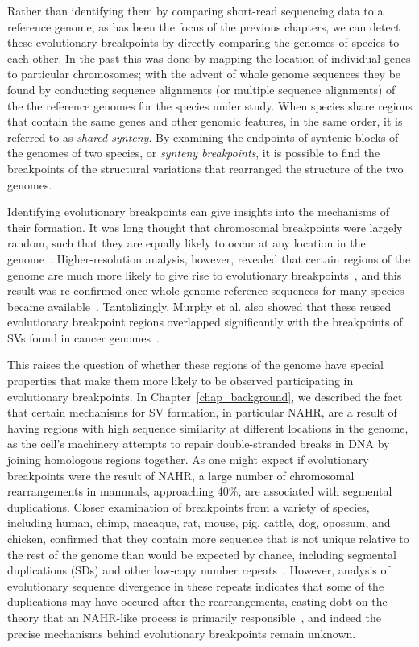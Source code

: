 Rather than identifying them by comparing short-read sequencing data to a reference genome, as has been the focus of the previous chapters, we can detect these evolutionary breakpoints by directly comparing the genomes of species to each other. In the past this was done by mapping the location of individual genes to particular chromosomes; with the advent of whole genome sequences they be found by conducting sequence alignments (or multiple sequence alignments) of the the reference genomes for the species under study. When species share regions that contain the same genes and other genomic features, in the same order, it is referred to as \emph{shared synteny}. By examining the endpoints of syntenic blocks of the genomes of two species, or \emph{synteny breakpoints}, it is possible to find the breakpoints of the structural variations that rearranged the structure of the two genomes.

Identifying evolutionary breakpoints can give insights into the mechanisms of their formation. It was long thought that chromosomal breakpoints were largely random, such that they are equally likely to occur at any location in the genome~\cite{Ono:1973tr,Nadeau:1984tm}. Higher-resolution analysis, however, revealed that certain regions of the genome are much more likely to give rise to evolutionary breakpoints~\cite{Pevzner:2003ba}, and this result was re-confirmed once whole-genome reference sequences for many species became available~\cite{Murphy:2005hv}. Tantalizingly, Murphy et al. also showed that these reused evolutionary breakpoint regions overlapped significantly with the breakpoints of SVs found in cancer genomes~\cite{Murphy:2005hv}.

This raises the question of whether these regions of the genome have special properties that make them more likely to be observed participating in evolutionary breakpoints. In Chapter~\ref{chap_background}, we described the fact that certain mechanisms for SV formation, in particular NAHR, are a result of having regions with high sequence similarity at different locations in the genome, as the cell's machinery attempts to repair double-stranded breaks in DNA by joining homologous regions together. As one might expect if evolutionary breakpoints were the result of NAHR, a large number of chromosomal rearrangements in mammals, approaching 40\%, are associated with segmental duplications\cite{Bailey:2004fb,Bailey:2006fn}. Closer examination of breakpoints from a variety of species, including human, chimp, macaque, rat, mouse, pig, cattle, dog, opossum, and chicken, confirmed that they contain more sequence that is not unique relative to the rest of the genome than would be expected by chance, including segmental duplications (SDs) and other low-copy number repeats~\cite{Larkin:2009ij}. However, analysis of evolutionary sequence divergence in these repeats indicates that some of the duplications may have occured after the rearrangements, casting dobt on the theory that an NAHR-like process is primarily responsible~\cite{Bailey:2004fb}, and indeed the precise mechanisms behind evolutionary breakpoints remain unknown.

